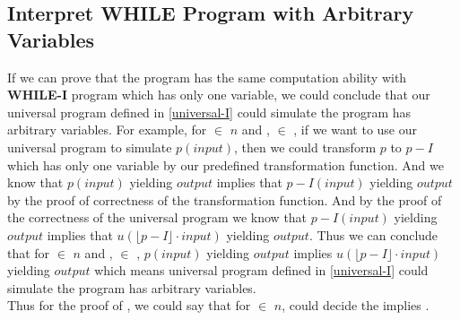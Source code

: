 \subsection{Interpret WHILE Program with Arbitrary Variables}
If we can prove that the \WHILE program has the same computation ability with \textbf{WHILE-I} program which has only one variable,
we could conclude that our universal \WHILE program defined in \ref{universal-I} could simulate the \WHILE program has arbitrary variables.
For example, for  $\in$  $n$ and ,  $\in$ , if we want to use our universal \WHILE program to simulate $p(input)$,
then we could transform $p$ to $p-I$ which has only one variable by our predefined transformation function.
And we know that $p(input)$ yielding $output$ implies that $p-I(input)$ yielding $output$ by the proof of correctness of the transformation function.
And by the proof of the correctness of the universal \WHILE program we know that $p-I(input)$ yielding $output$ implies that $u(\lfloor p-I\rfloor \cdot input)$ yielding $output$.
Thus we can conclude that for  $\in$  $n$ and ,  $\in$ , $p(input)$ yielding $output$ implies $u(\lfloor p-I\rfloor \cdot input)$ yielding $output$ which means universal \WHILE program defined in \ref{universal-I} could simulate the \WHILE program has arbitrary variables.\\
Thus for the proof of , we could say that for  $\in$  $n$,  could decide the  implies .

